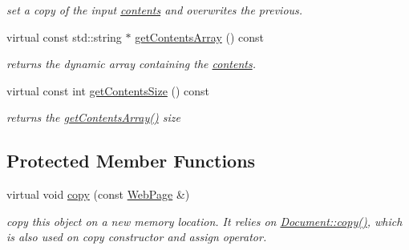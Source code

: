 \begin{DoxyCompactItemize}
\begin{DoxyCompactList}\small\item\em set a copy of the input \hyperlink{classdocs_1_1WebPage_a67d46a145ff4e7093fb1b8f56e539895}{contents} and overwrites the previous. \end{DoxyCompactList}\item 
\hypertarget{classdocs_1_1WebPage_a7bebbf9d6f6ed1d5d37807ce14a34b2b}{virtual const std\-::string $\ast$ \hyperlink{classdocs_1_1WebPage_a7bebbf9d6f6ed1d5d37807ce14a34b2b}{get\-Contents\-Array} () const }\label{classdocs_1_1WebPage_a7bebbf9d6f6ed1d5d37807ce14a34b2b}

\begin{DoxyCompactList}\small\item\em returns the dynamic array containing the \hyperlink{classdocs_1_1WebPage_a67d46a145ff4e7093fb1b8f56e539895}{contents}. \end{DoxyCompactList}\item 
\hypertarget{classdocs_1_1WebPage_ae58ebf97dc7208acbd7b86b267f3b699}{virtual const int \hyperlink{classdocs_1_1WebPage_ae58ebf97dc7208acbd7b86b267f3b699}{get\-Contents\-Size} () const }\label{classdocs_1_1WebPage_ae58ebf97dc7208acbd7b86b267f3b699}

\begin{DoxyCompactList}\small\item\em returns the \hyperlink{classdocs_1_1WebPage_a7bebbf9d6f6ed1d5d37807ce14a34b2b}{get\-Contents\-Array()} size \end{DoxyCompactList}\end{DoxyCompactItemize}
\subsection*{Protected Member Functions}
\begin{DoxyCompactItemize}
\item 
\hypertarget{classdocs_1_1WebPage_a52ac0dc90ab3f5621d0fa41d8386806c}{virtual void \hyperlink{classdocs_1_1WebPage_a52ac0dc90ab3f5621d0fa41d8386806c}{copy} (const \hyperlink{classdocs_1_1WebPage}{Web\-Page} \&)}\label{classdocs_1_1WebPage_a52ac0dc90ab3f5621d0fa41d8386806c}

\begin{DoxyCompactList}\small\item\em copy this object on a new memory location. It relies on \hyperlink{classdocs_1_1Document_ad8b6a91c7a8e39a880790d14aba14322}{Document\-::copy()}, which is also used on copy constructor and assign operator. \end{DoxyCompactList}\end{DoxyCompactItemize}
